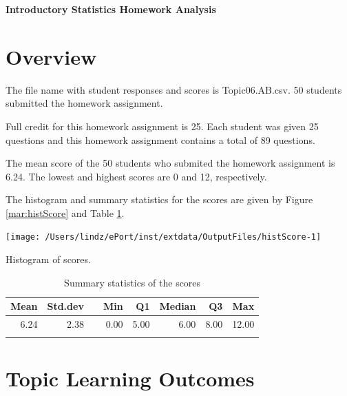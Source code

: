\documentclass[12pt,english,nohyper]{tufte-handout}\usepackage[]{graphicx}\usepackage[]{color}
\makeatletter
\newenvironment{kframe}{%
 \def\at@end@of@kframe{}%
 \ifinner\ifhmode%
  \def\at@end@of@kframe{\end{minipage}}%
  \begin{minipage}{\columnwidth}%
 \fi\fi%
 \def\FrameCommand##1{\hskip\@totalleftmargin \hskip-\fboxsep
 \colorbox{shadecolor}{##1}\hskip-\fboxsep
     \hskip-\linewidth \hskip-\@totalleftmargin \hskip\columnwidth}%
 \MakeFramed {\advance\hsize-\width
   \@totalleftmargin\z@ \linewidth\hsize
   \@setminipage}}%
 {\par\unskip\endMakeFramed%
 \at@end@of@kframe}
\newenvironment{knitrout}{}{} %
\makeatother
\begin{document}
\setcaptionfont{
  \normalfont\footnotesize
  \color{black}
}





\centerline{\Large\bf Introductory Statistics Homework Analysis}


\section{Overview}
The file name with student responses and scores is Topic06.AB.csv. 50 students submitted the homework assignment.

Full credit for this homework assignment is 25. Each student was given 25 questions and this homework assignment contains a total of 89 questions.  

The mean score of the 50 students who submited the homework assignment is 6.24. The lowest and highest scores are 0 and 12, respectively.

The histogram and summary statistics for the scores are given by Figure \ref{mar:histScore} and Table \ref{tab:summary}.

\begin{knitrout}
\color{fgcolor}\begin{kframe}


{\ttfamily\noindent\color{warningcolor}{\#\# Warning: Removed 2 rows containing missing values (geom\_bar).}}\end{kframe}\begin{marginfigure}
\texttt{[image: /Users/lindz/ePort/inst/extdata/OutputFiles/histScore-1]} \caption[Histogram of scores]{Histogram of scores.}\label{mar:histScore}
\end{marginfigure}


\end{knitrout}

\begin{longtable}{rrlrrrrr}
  \hline
Mean & Std.dev &   & Min & Q1 & Median & Q3 & Max \\ 
  \hline
6.24 & 2.38 &  & 0.00 & 5.00 & 6.00 & 8.00 & 12.00 \\ 
   \hline
\hline
\caption{Summary statistics of the scores} 
\label{tab:summary}
\end{longtable}


\clearpage
\newpage{}
\section{Topic Learning Outcomes}
\end{document}
